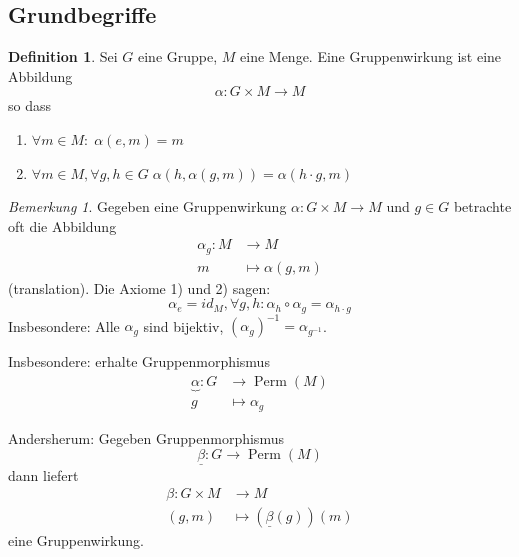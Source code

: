 \documentclass[12pt,parskip=full]{scrartcl}
\theoremstyle{definition}
\newtheorem{definition}[theorem]{Definition}
\theoremstyle{remark}
\newtheorem*{remark}{Bemerkung}
\begin{document}
	\subsection{Grundbegriffe}
	
	\begin{definition}
		Sei $G$ eine Gruppe, $M$ eine Menge. Eine Gruppenwirkung ist eine Abbildung
		\begin{equation*}
			\alpha: G \times M \to M
		\end{equation*}
		so dass
		\begin{enumerate}
			\item $\forall m \in M: \; \alpha(e,m) = m$
			\item $\forall m \in M, \forall g,h \in G \; \alpha(h, \alpha(g,m)) = \alpha(h \cdot g, m)$
		\end{enumerate}
	\end{definition}

	\begin{remark}
		Gegeben eine Gruppenwirkung $\alpha: G \times M \to M$ und $g \in G$ betrachte oft die Abbildung
		\begin{align*}
			\alpha_g: M &\longrightarrow M\\
			m &\longmapsto \alpha(g,m)
		\end{align*}
		(translation). Die Axiome 1) und 2) sagen:
		\begin{equation*}
			\alpha_e = id_M, \forall g,h: \alpha_h \circ \alpha_g = \alpha_{h \cdot g}
		\end{equation*}
		Insbesondere: Alle $\alpha_g$ sind bijektiv, $(\alpha_g)^{-1} = \alpha_{g^{-1}}$.
		
		Insbesondere: erhalte Gruppenmorphismus
		\begin{align*}
			\underbrace{\alpha}: G &\longrightarrow \operatorname{Perm}(M) \\
			g &\longmapsto \alpha_g
		\end{align*}
		
		Andersherum: Gegeben Gruppenmorphismus
		\begin{equation*}
			\underline{\beta}: G \to \operatorname{Perm}(M)
		\end{equation*}
		dann liefert
		\begin{align*}
			\beta: G \times M &\longrightarrow M \\
			(g,m) &\longmapsto (\underline{\beta}(g))(m)
		\end{align*}
		eine Gruppenwirkung.
	\end{remark}
\end{document}

